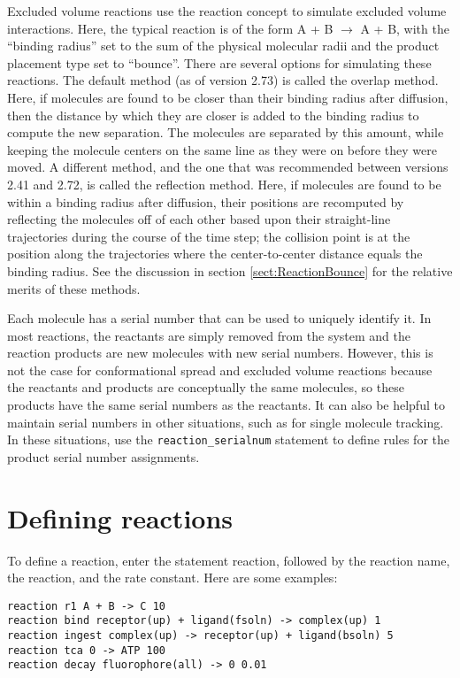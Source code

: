 \documentclass {scrbook}
\newcommand {\ttt} {\texttt}
\begin{document}
Excluded volume reactions use the reaction concept to simulate excluded volume interactions. Here, the typical reaction is of the form A + B $\rightarrow$ A + B, with the ``binding radius'' set to the sum of the physical molecular radii and the product placement type set to ``bounce''. There are several options for simulating these reactions. The default method (as of version 2.73) is called the overlap method. Here, if molecules are found to be closer than their binding radius after diffusion, then the distance by which they are closer is added to the binding radius to compute the new separation. The molecules are separated by this amount, while keeping the molecule centers on the same line as they were on before they were moved. A different method, and the one that was recommended between versions 2.41 and 2.72, is called the reflection method. Here, if molecules are found to be within a binding radius after diffusion, their positions are recomputed by reflecting the molecules off of each other based upon their straight-line trajectories during the course of the time step; the collision point is at the position along the trajectories where the center-to-center distance equals the binding radius. See the discussion in section \ref{sect:ReactionBounce} for the relative merits of these methods.

Each molecule has a serial number that can be used to uniquely identify it. In most reactions, the reactants are simply removed from the system and the reaction products are new molecules with new serial numbers. However, this is not the case for conformational spread and excluded volume reactions because the reactants and products are conceptually the same molecules, so these products have the same serial numbers as the reactants. It can also be helpful to maintain serial numbers in other situations, such as for single molecule tracking. In these situations, use the \ttt{reaction\_serialnum} statement to define rules for the product serial number assignments.

\section{Defining reactions}

To define a reaction, enter the statement reaction, followed by the reaction name, the reaction, and the rate constant. Here are some examples:

\begin{lstlisting}[style=SSAC]
reaction r1 A + B -> C 10
reaction bind receptor(up) + ligand(fsoln) -> complex(up) 1
reaction ingest complex(up) -> receptor(up) + ligand(bsoln) 5
reaction tca 0 -> ATP 100
reaction decay fluorophore(all) -> 0 0.01
\end{lstlisting}
\end{document}
